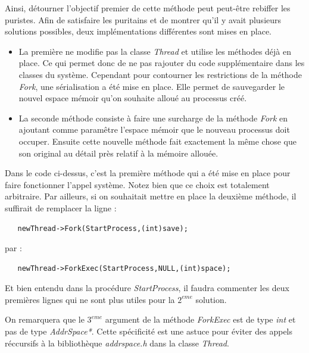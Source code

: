 \documentclass[a4paper,10pt]{article}
\begin{document}
    Ainsi, détourner l'objectif premier de cette méthode peut peut-être rebiffer les puristes. Afin de satisfaire les puritains et de montrer qu'il y avait plusieurs
    solutions possibles, deux implémentations différentes sont mises en place. 
    
    \begin{itemize}
     \item La première ne modifie pas la classe \emph{Thread} et utilise les méthodes
    déjà en place. Ce qui permet donc de ne pas rajouter du code supplémentaire dans les classes du système. Cependant pour contourner les restrictions
    de la méthode \emph{Fork}, une sérialisation a été mise en place. Elle permet de sauvegarder le nouvel espace mémoir qu'on souhaite alloué au 
    processus créé.
    
    \item La seconde méthode consiste à faire une surcharge de la méthode \emph{Fork} en ajoutant comme paramêtre l'espace mémoir que le nouveau processus
    doit occuper. Ensuite cette nouvelle méthode fait exactement la même chose que son original au détail près relatif à la mémoire allouée.
    \end{itemize}
  Dans le code ci-dessus, c'est la première méthode qui a été mise en place pour faire fonctionner l'appel système. Notez bien que ce choix est totalement 
  arbitraire. 
  Par ailleurs, si on souhaitait mettre en place la deuxième méthode, il suffirait de remplacer la ligne : 
  \begin{lstlisting}
   newThread->Fork(StartProcess,(int)save);
  \end{lstlisting}
  par : 
  \begin{lstlisting}
   newThread->ForkExec(StartProcess,NULL,(int)space);
  \end{lstlisting}
  Et bien entendu dans la procédure \emph{StartProcess}, il faudra commenter les deux premières lignes qui ne sont plus utiles pour la $2^{eme}$ solution.
  
  On remarquera que le $3^{eme}$ argument de la méthode \emph{ForkExec} est de type \emph{int} et pas de type \emph{AddrSpace*}. Cette spécificité est une 
  astuce pour éviter des appels réccursifs à la bibliothèque \emph{addrspace.h} dans la classe \emph{Thread}.
  
\end{document}
